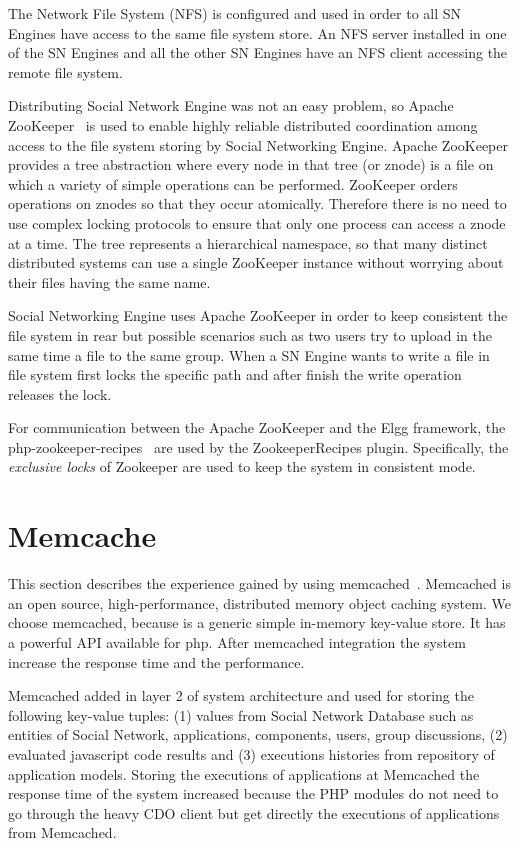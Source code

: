 The Network File System (NFS) is configured and used in order to all SN Engines have access to the same file system store. An NFS server installed in one of the SN Engines and all the other SN Engines have an NFS client accessing the remote file system.   

Distributing Social Network Engine was not an easy problem, so Apache ZooKeeper~\cite{zookeeper_url} is used to enable highly reliable distributed coordination among access to the file system storing by Social Networking Engine. 
Apache ZooKeeper provides a tree abstraction where every node in that tree (or znode) is a file on which a variety of simple operations can be performed. ZooKeeper orders operations on znodes so that they occur atomically. Therefore there is no need to use complex locking protocols to ensure that only one process can access a znode at a time. The tree represents a hierarchical namespace, so that many distinct distributed systems can use a single ZooKeeper instance without worrying about their files having the same name.

Social Networking Engine uses Apache ZooKeeper in order to keep consistent the file system in rear but possible scenarios such as two users try to upload in the same time a file to the same group. When a SN Engine wants to write a file in file system first locks the specific path and after finish the write operation releases the lock.

For communication between the Apache ZooKeeper and the Elgg framework, the php-zookeeper-recipes~\cite{zookeeper_recipes_url} are used by the ZookeeperRecipes plugin. Specifically, the {\it exclusive locks} of Zookeeper are used to keep the system in consistent mode.

\section{Memcache}
\label{sec:memcache_implementation}
This section describes the experience gained by using memcached~\cite{memcache_url}. Memcached is an open source, high-performance, distributed memory object caching system. We choose memcached, because is a generic simple in-memory key-value store. It has a powerful API available for php. After memcached integration the system increase the response time and the performance.

Memcached added in layer 2 of system architecture and used for storing the following key-value tuples: (1) values from Social Network Database such as entities of Social Network, applications, components, users, group discussions, (2) evaluated javascript code results and (3) executions histories from repository of application models. Storing the executions of applications at Memcached the response time of the system increased because the PHP modules do not need to go through the heavy CDO client but get directly the executions of applications from Memcached.


